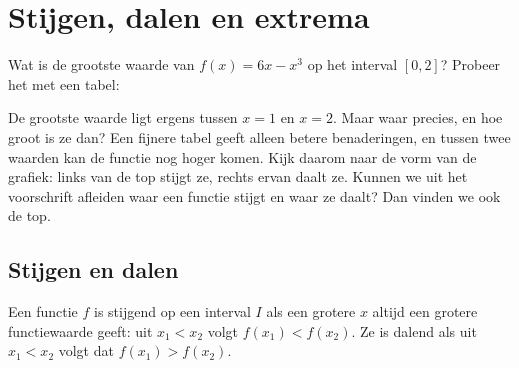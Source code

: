 \begin{oefeningen}[Start]

\end{oefeningen}

\section{Stijgen, dalen en extrema}

Wat is de grootste waarde van $f(x) = 6x - x^3$ op het interval $[0, 2]$? Probeer het met een tabel:


De grootste waarde ligt ergens tussen $x = 1$ en $x = 2$. Maar waar precies, en hoe groot is ze dan? Een fijnere tabel geeft alleen betere benaderingen, en tussen twee waarden kan de functie nog hoger komen. Kijk daarom naar de vorm van de grafiek: links van de top stijgt ze, rechts ervan daalt ze. Kunnen we uit het voorschrift afleiden waar een functie stijgt en waar ze daalt? Dan vinden we ook de top.

\subsection{Stijgen en dalen}

Een functie $f$ is stijgend op een interval $I$ als een grotere $x$ altijd een grotere functiewaarde geeft: uit $x_1 < x_2$ volgt $f(x_1) < f(x_2)$. Ze is dalend als uit $x_1 < x_2$ volgt dat $f(x_1) > f(x_2)$.


